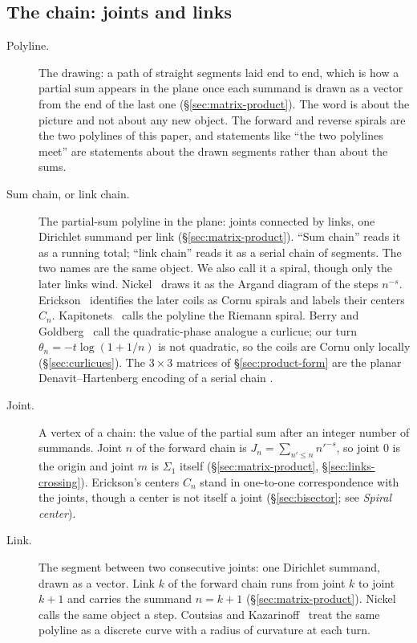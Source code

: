 \documentclass[11pt]{article}
\theoremstyle{definition}
\begin{document}
\subsection*{The chain: joints and links}

\begin{description}
\item[Polyline.]
The drawing: a path of straight segments laid end to end, which is
how a partial sum appears in the plane once each summand is drawn as
a vector from the end of the last one
(\S\ref{sec:matrix-product}).
The word is about the picture and not about any new object. The
forward and reverse spirals are the two polylines of this paper, and
statements like ``the two polylines meet'' are statements about the
drawn segments rather than about the sums.

\item[Sum chain, or link chain.]
The partial-sum polyline in the plane: joints connected by links,
one Dirichlet summand per link
(\S\ref{sec:matrix-product}).
``Sum chain'' reads it as a running total; ``link chain'' reads it
as a serial chain of segments. The two names are the same object.
We also call it a spiral, though only the later links wind.
Nickel~\cite{Nickel2013} draws it as the Argand diagram of the
steps $n^{-s}$.
Erickson~\cite{Erickson2005} identifies the later coils as Cornu
spirals and labels their centers $C_n$.
Kapitonets~\cite{Kapitonets2019} calls the polyline the Riemann
spiral.
Berry and Goldberg~\cite{BerryGoldberg1988} call the quadratic-phase
analogue a curlicue; our turn $\theta_n=-t\log(1+1/n)$ is not
quadratic, so the coils are Cornu only locally
(\S\ref{sec:curlicues}).
The $3\times3$ matrices of \S\ref{sec:product-form} are the planar
Denavit--Hartenberg encoding of a serial chain
\cite{DenavitHartenberg1955}.

\item[Joint.]
A vertex of a chain: the value of the partial sum after an integer
number of summands.
Joint $n$ of the forward chain is $J_n=\sum_{n'\le n}n'^{-s}$, so
joint $0$ is the origin and joint $m$ is $\Sigma_1$ itself
(\S\ref{sec:matrix-product}, \S\ref{sec:links-crossing}).
Erickson's centers $C_n$ stand in one-to-one correspondence with the
joints, though a center is not itself a joint
(\S\ref{sec:bisector}; see \emph{Spiral center}).

\item[Link.]
The segment between two consecutive joints: one Dirichlet summand,
drawn as a vector.
Link $k$ of the forward chain runs from joint $k$ to joint $k+1$ and
carries the summand $n=k+1$
(\S\ref{sec:matrix-product}).
Nickel calls the same object a step.
Coutsias and Kazarinoff~\cite{CoutsiasKazarinoff1987} treat the same
polyline as a discrete curve with a radius of curvature at each turn.


\end{description}
\end{document}
